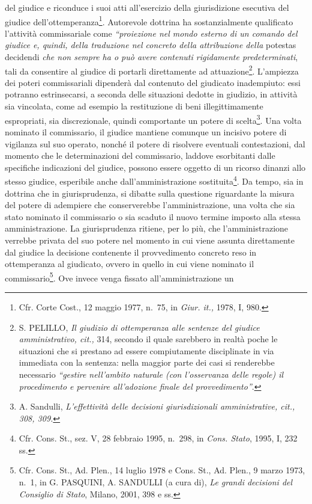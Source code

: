 \documentclass[12pt,it,a4paper,]{report}
\begin{document}
del giudice e riconduce i suoi atti all'esercizio della giurisdizione
esecutiva del giudice dell'ottemperanza\footnote{Cfr. Corte Cost., 12
  maggio 1977, n.~75, in \emph{Giur. it.,} 1978, I, 980.}. Autorevole
dottrina ha sostanzialmente qualificato l'attività commissariale come
\emph{``proiezione nel mondo esterno di un comando del giudice e,
quindi, della traduzione nel concreto della attribuzione della} potestas
decidendi \emph{che non sempre ha o può avere contenuti rigidamente
predeterminati}, tali da consentire al giudice di portarli direttamente
ad attuazione\footnote{S. PELILLO, \emph{Il giudizio di ottemperanza
  alle sentenze del giudice amministrativo, cit.,} 314, secondo il quale
  sarebbero in realtà poche le situazioni che si prestano ad essere
  compiutamente disciplinate in via immediata con la sentenza: nella
  maggior parte dei casi si renderebbe necessario \emph{``gestire
  nell'ambito naturale (con l'osservanza delle regole) il procedimento e
  pervenire all'adozione finale del provvedimento''}.}. L'ampiezza dei
poteri commissariali dipenderà dal contenuto del giudicato inadempiuto:
essi potranno estrinsecarsi, a seconda delle situazioni dedotte in
giudizio, in attività sia vincolata, come ad esempio la restituzione di
beni illegittimamente espropriati, sia discrezionale, quindi comportante
un potere di scelta\footnote{A. Sandulli, \emph{L'effettività delle
  decisioni giurisdizionali amministrative, cit., 308, 309.}}. Una volta
nominato il commissario, il giudice mantiene comunque un incisivo potere
di vigilanza sul suo operato, nonché il potere di risolvere eventuali
contestazioni, dal momento che le determinazioni del commissario,
laddove esorbitanti dalle specifiche indicazioni del giudice, possono
essere oggetto di un ricorso dinanzi allo stesso giudice, esperibile
anche dall'amministrazione sostituita\footnote{Cfr. Cons. St., sez. V,
  28 febbraio 1995, n.~298, in \emph{Cons. Stato}, 1995, I, 232 ss.}. Da
tempo, sia in dottrina che in giurisprudenza, si dibatte sulla questione
riguardante la misura del potere di adempiere che conserverebbe
l'amministrazione, una volta che sia stato nominato il commissario o sia
scaduto il nuovo termine imposto alla stessa amministrazione. La
giurisprudenza ritiene, per lo più, che l'amministrazione verrebbe
privata del suo potere nel momento in cui viene assunta direttamente dal
giudice la decisione contenente il provvedimento concreto reso in
ottemperanza al giudicato, ovvero in quello in cui viene nominato il
commissario\footnote{Cfr. Cons. St., Ad. Plen., 14 luglio 1978 e Cons.
  St., Ad. Plen., 9 marzo 1973, n.~1, in G. PASQUINI, A. SANDULLI (a
  cura di), \emph{Le grandi decisioni del Consiglio di Stato}, Milano,
  2001, 398 e ss.}. Ove invece venga fissato all'amministrazione un
\end{document}
